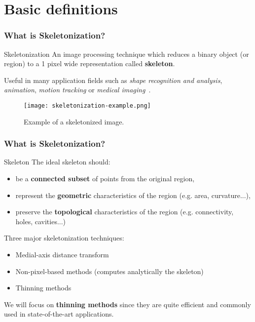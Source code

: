 \section{Basic definitions}
\begin{frame}
  \frametitle{What is Skeletonization?}
  \begin{block}{Skeletonization}
    An image processing technique which reduces a binary object (or region) to a 1 pixel wide representation called \textbf{skeleton}.
  \end{block}
  Useful in many application fields such as \emph{shape recognition and analysis}, \emph{animation}, \emph{motion tracking} or \emph{medical imaging}~\cite{skel-applications}.
  \begin{figure}
    \begin{center}
      \texttt{[image: skeletonization-example.png]}
      \caption{Example of a skeletonized image.}
    \end{center}
  \end{figure}
\end{frame}

\begin{frame}
  \label{sli:skeleton}
  \frametitle{What is Skeletonization?}
  \begin{block}{Skeleton}
    The ideal skeleton should:
    \begin{itemize}
      \item be a \textbf{connected subset} of points from the original region,
      \item represent the \textbf{geometric} characteristics of the region (e.g. area, curvature...),
      \item preserve the \textbf{topological} characteristics of the region (e.g. connectivity, holes, cavities...)
    \end{itemize}
  \end{block}

  Three major skeletonization techniques:
  \begin{itemize}
    \item Medial-axis distance transform
    \item Non-pixel-based methods (computes analytically the skeleton)
    \item Thinning methods
  \end{itemize}
  \vspace{0.5cm}
  We will focus on \textbf{thinning methods} since they are quite efficient and commonly used in state-of-the-art applications.
\end{frame}
